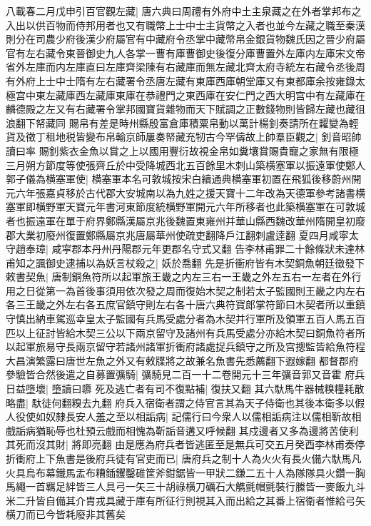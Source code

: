 八載春二月戊申引百官觀左藏|{
	唐六典曰周禮有外府中土主泉藏之在外者掌邦布之入出以供百物而侍邦用者也又有職幣上士中士主貨幣之入者也並今左藏之職至秦漢則分在司農少府後漢少府屬官有中藏府令丞掌中藏幣帛金銀貨物魏氏因之晉少府屬官有左右藏令東晉御史九人各掌一曹有庫曹御史後復分庫曹置外左庫内左庫宋文帝省外左庫而内左庫直曰左庫齊梁陳有右藏庫而無左藏北齊太府寺統左右藏令丞後周有外府上士中士隋有左右藏署令丞唐左藏有東庫西庫朝堂庫又有東都庫余按雍錄太極宫中東左藏庫西左藏庫東庫在恭禮門之東西庫在安仁門之西大明宫中有左藏庫在麟德殿之左又有右藏署令掌邦國寶貨雜物而天下賦調之正數錢物則皆歸左藏也藏徂浪翻下帑藏同}
賜帛有差是時州縣殷富倉庫積粟帛動以萬計楊釗奏請所在糶變為輕貨及徵丁租地税皆變布帛輸京師屢奏帑藏充牣古今罕儔故上帥羣臣觀之|{
	釗音昭帥讀曰率}
賜釗紫衣金魚以賞之上以國用豐衍故視金帛如糞壤賞賜貴寵之家無有限極　三月朔方節度等使張齊丘於中受降城西北五百餘里木刺山築横塞軍以振遠軍使鄭人郭子儀為横塞軍使|{
	横塞軍本名可敦城按宋白續通典横塞軍初置在飛狐後移蔚州開元六年張嘉貞移於古代郡大安城南以為九姓之援天寶十二年改為天德軍參考諸書横塞軍即横野軍天寶元年書河東節度統横野軍開元六年所移者也此築横塞軍在可敦城者也振遠軍在單于府界鄭縣漢屬京兆後魏置東雍州并華山縣西魏改華州隋開皇初廢郡大業初廢州復置鄭縣屬京兆唐屬華州使疏吏翻降戶江翻刺盧逹翻}
夏四月咸寜太守趙奉璋|{
	咸寜郡本丹州丹陽郡元年更郡名守式又翻}
告李林甫罪二十餘條狀未達林甫知之諷御史逮捕以為妖言杖殺之|{
	妖於喬翻}
先是折衝府皆有木契銅魚朝廷徵發下敕書契魚|{
	唐制銅魚符所以起軍旅王畿之内左三右一王畿之外左五右一左者在外行用之日從第一為首後事須用依次發之周而復始木契之制若太子監國則王畿之内左右各三王畿之外左右各五庶官鎮守則左右各十唐六典符寶郎掌符節曰木契者所以重鎮守慎出納車駕巡幸皇太子監國有兵馬受處分者為木契并行軍所及領軍五百人馬五百匹以上征討皆給木契三公以下兩京留守及諸州有兵馬受處分亦給木契曰銅魚符者所以起軍旅易守長兩京留守若諸州諸軍折衝府諸處捉兵鎮守之所及宫摠監皆給魚符程大昌演繁露曰唐世左魚之外又有敕牒將之故兼名魚書先悉薦翻下遐嫁翻}
都督郡府參驗皆合然後遣之自募置彍騎|{
	彍騎見二百一十二卷開元十三年彍音郭又音霍}
府兵日益墮壞|{
	墮讀曰隳}
死及逃亡者有司不復點補|{
	復扶又翻}
其六馱馬牛器械糗糧耗散略盡|{
	馱徒何翻糗去九翻}
府兵入宿衛者謂之侍官言其為天子侍衛也其後本衛多以假人役使如奴隸長安人羞之至以相詬病|{
	記儒行曰今衆人以儒相詬病注以儒相靳故相戲詬病猶恥辱也杜預云戲而相愧為靳詬音遘又呼候翻}
其戍邊者又多為邊將苦使利其死而沒其財|{
	將即亮翻}
由是應為府兵者皆逃匿至是無兵可交五月癸酉李林甫奏停折衝府上下魚書是後府兵徒有官吏而已|{
	唐府兵之制十人為火火有長火備六馱馬凡火具烏布幕鐵馬盂布糟鍤钁鑿碓筐斧鉗鋸皆一甲狀二鎌二五十人為隊隊具火鑽一胸馬繩一首羈足絆皆三人具弓一矢三十胡祿横刀礪石大觹氈帽氈裝行縢皆一麥飯九斗米二升皆自備其介胄戎具藏于庫有所征行則視其入而出給之其番上宿衛者惟給弓矢横刀而已今皆耗廢非其舊矣}
